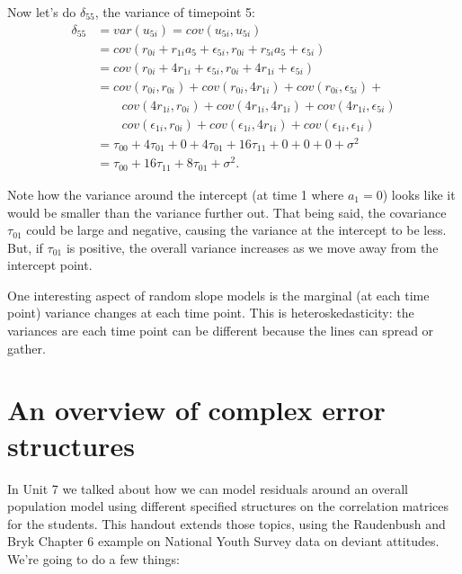 \documentclass[
  letterpaper,
  DIV=11,
  numbers=noendperiod]{scrreprt}
\begin{document}
Now let's do \(\delta_{55}\), the variance of timepoint 5:
\[\begin{aligned}
\delta_{55} &= var( u_{5i} ) = cov( u_{5i}, u_{5i} ) \\
   &= cov(  r_{0i} + r_{1i} a_5 + \epsilon_{5i},  r_{0i} + r_{5i} a_5 + \epsilon_{5i} ) \\
   &= cov(  r_{0i} + 4 r_{1i} + \epsilon_{5i},  r_{0i} + 4 r_{1i} + \epsilon_{5i} ) \\
   &= cov(  r_{0i}, r_{0i} ) + cov(  r_{0i}, 4 r_{1i} )  + cov( r_{0i},  \epsilon_{5i} ) + \\
    &\qquad cov( 4 r_{1i}, r_{0i} ) + cov( 4 r_{1i}, 4 r_{1i} )  + cov( 4 r_{1i}, \epsilon_{5i} ) \\
    & \qquad cov( \epsilon_{1i}, r_{0i}) + cov( \epsilon_{1i}, 4 r_{1i} )  + cov( \epsilon_{1i},\epsilon_{1i} )  \\
   &= \tau_{00} + 4 \tau_{01} + 0 + 4 \tau_{01} + 16 \tau_{11} + 0 + 0 + 0 + \sigma^2 \\
   &= \tau_{00} + 16 \tau_{11} + 8 \tau_{01} + \sigma^2 .
\end{aligned}\]

Note how the variance around the intercept (at time 1 where \(a_1 = 0\))
looks like it would be smaller than the variance further out. That being
said, the covariance \(\tau_{01}\) could be large and negative, causing
the variance at the intercept to be less. But, if \(\tau_{01}\) is
positive, the overall variance increases as we move away from the
intercept point.

One interesting aspect of random slope models is the marginal (at each
time point) variance changes at each time point. This is
heteroskedasticity: the variances are each time point can be different
because the lines can spread or gather.

\chapter{An overview of complex error
structures}\label{an-overview-of-complex-error-structures}

In Unit 7 we talked about how we can model residuals around an overall
population model using different specified structures on the correlation
matrices for the students. This handout extends those topics, using the
Raudenbush and Bryk Chapter 6 example on National Youth Survey data on
deviant attitudes. We're going to do a few things:
\end{document}
